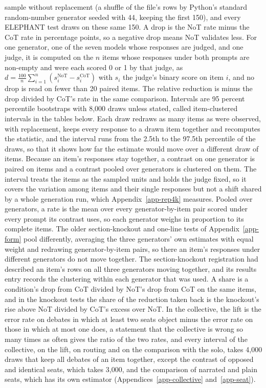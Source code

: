 sample without replacement (a shuffle of the file's rows by Python's standard
random-number generator seeded with 44, keeping the first 150), and every
ELEPHANT test draws on these same 150.
A drop is the NoT rate minus the CoT rate in percentage points, so a negative
drop means NoT validates less. For one generator, one of the seven models
whose responses are judged, and one judge, it is computed on the $n$ items
whose responses under both prompts are non-empty
and were each scored 0 or 1 by that judge, as
$d = \tfrac{100}{n}\sum_{i=1}^{n}(s_i^{\mathrm{NoT}} - s_i^{\mathrm{CoT}})$
with $s_i$ the judge's binary score on item $i$, and no drop is read on fewer
than 20 paired items. The relative reduction is minus the drop divided by
CoT's rate in the same comparison.
Intervals are 95 percent percentile bootstraps with 8,000 draws unless
stated, called item-clustered intervals in the tables below. Each draw
redraws as many items as were observed, with replacement, keeps every
response to a drawn item together and recomputes the statistic, and the
interval runs from the 2.5th to the 97.5th percentile of the draws, so that
it shows how far the estimate would move over a different draw of items.
Because an item's responses stay together, a contrast on one generator is
paired on items and a contrast pooled over generators is clustered on them.
The interval treats the items as the
sampled units and holds the judge fixed, so it covers the variation among
items and their single responses but not a shift shared by a whole
generation run, which Appendix~\ref{app-rep4k} measures. Pooled over
generators, a rate is the mean over every generator-by-item pair scored under
every prompt its contrast uses, so each generator weighs in proportion to its
complete items. The older section-knockout and one-line tests of
Appendix~\ref{app-form} pool differently, averaging the three generators' own
estimates with equal weight and redrawing generator-by-item pairs, so there an
item's responses under different generators do not move together. The
section-knockout registration had described an item's rows on all three
generators moving together, and its results entry records the clustering
within each generator that was used. A share is a condition's drop from CoT
divided by NoT's drop from CoT on the same items, and in the knockout tests
the share of the reduction taken back is the knockout's rise above NoT
divided by CoT's excess over NoT. In the collective, the lift is the error
rate on debates in which at least two seats object minus the error rate on
those in which at most one does, a statement that the collective is wrong so
many times as often gives the ratio of the two rates, and every interval of
the collective, on the lift, on routing and on the comparison with the solo,
takes 4,000 draws that keep all debates of an item together, except the
contrast of opposed and identical seats, which takes 3,000, and the comparison
of narrated and plain seats, which has its own estimator
(Appendices~\ref{app-collective} and~\ref{app-seat}).

